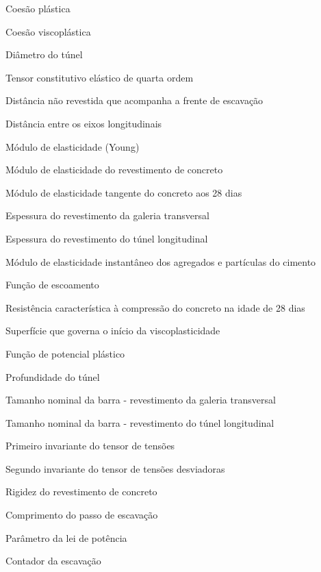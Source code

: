 \item[$c$]								Coesão plástica
\item[$c^{vp}$]							Coesão viscoplástica
\item[$D$]								Diâmetro do túnel
\item[$\Dllll$]							Tensor constitutivo elástico de quarta ordem
\item[$d_0$]							Distância não revestida que acompanha a frente de escavação
\item[$d_1$]							Distância entre os eixos longitudinais
\item[$E$]								Módulo de elasticidade (Young)
\item[$E_c$]							Módulo de elasticidade do revestimento de concreto
\item[$E_{c28}$]						Módulo de elasticidade tangente do concreto aos 28 dias
\item[$e_{g}$]							Espessura do revestimento da galeria transversal
\item[$e_{t}$]							Espessura do revestimento do túnel longitudinal
\item[$E_0$]							Módulo de elasticidade instantâneo dos agregados e partículas do cimento
\item[$f$]								Função de escoamento
\item[$d_{ck}$]							Resistência característica à compressão do concreto na idade de 28 dias
\item[$f^{vp}$]							Superfície que governa o início da viscoplasticidade
\item[$g$]								Função de potencial plástico
\item[$H$]								Profundidade do túnel
\item[$h_g$]							Tamanho nominal da barra - revestimento da galeria transversal
\item[$h_t$]							Tamanho nominal da barra - revestimento do túnel longitudinal
\item[$I_1$]							Primeiro invariante do tensor de tensões
\item[$J_2$]							Segundo invariante do tensor de tensões desviadoras
\item[$K_c$]							Rigidez do revestimento de concreto
\item[$L_p$]							Comprimento do passo de escavação
\item[$n$]								Parâmetro da lei de potência
\item[$n_{esc}$]						Contador da escavação
